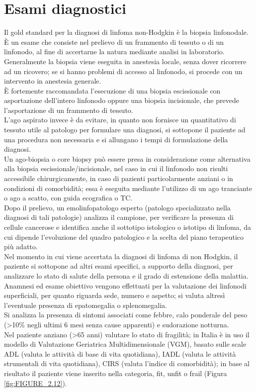 \section{Esami diagnostici}
Il gold standard per la diagnosi di linfoma non-Hodgkin è la biopsia linfonodale. 
È un esame che consiste nel prelievo di un frammento di tessuto o di un linfonodo, al fine di 
accertarne la natura mediante analisi in laboratorio. 
Generalmente la biopsia viene eseguita in anestesia locale, senza dover ricorrere ad un ricovero; 
se si hanno problemi di accesso al linfonodo, si procede con un intervento in anestesia generale\cite{ISS}.\\
È fortemente raccomandata l’esecuzione di una biopsia escissionale con asportazione dell’intero linfonodo 
oppure una biopsia incisionale, che prevede l’asportazione di un frammento di tessuto\cite{AMERICANCANCER}.\\ 
L’ago aspirato invece è da evitare, in quanto non fornisce un quantitativo di tessuto utile al patologo per formulare 
una diagnosi, si sottopone il paziente ad una procedura non necessaria e si allungano i tempi di formulazione 
della diagnosi\cite{reteveneta}.\\
Un ago-biopsia o core biopsy può essere presa in considerazione come alternativa alla biopsia escissionale/incisionale,
nel caso in cui il linfonodo non risulti accessibile chirurgicamente, in caso di pazienti particolarmente anziani o in 
condizioni di comorbidità; essa è eseguita mediante l’utilizzo di un ago tranciante o ago a scatto, con guida 
ecografica o TC\cite{reteveneta}.\\
Dopo il prelievo, un emolinfopatologo esperto (patologo specializzato nella diagnosi di tali patologie) analizza 
il campione, per verificare la presenza di cellule cancerose e identifica anche il sottotipo 
istologico o istotipo di linfoma, da cui dipende l’evoluzione del quadro patologico e la scelta del piano 
terapeutico più adatto\cite{LLS}.\\

Nel momento in cui viene accertata la diagnosi di linfoma di non Hodgkin, il paziente si sottopone ad altri 
esami specifici, a supporto della diagnosi, per analizzare lo stato di salute della persona e il grado di 
estensione della malattia.\\
Anamnesi ed esame obiettivo vengono effettuati per la valutazione dei linfonodi superficiali, per quanto 
riguarda sede, numero e aspetto; si valuta altresì l'eventuale presenza di epatomegalia o splenomegalia.\\
Si analizza la presenza di sintomi associati come febbre, calo ponderale del peso 
(>10\% negli ultimi 6 mesi senza cause apparenti) e sudorazione notturna\cite{reteveneta}.\\
Nel paziente anziano (>65 anni) valutare lo stato di fragilità; in Italia è in uso il modello di 
Valutazione Geriatrica Multidimensionale (VGM), basato sulle scale ADL (valuta le attività di base di vita quotidiana),
IADL (valuta le attività strumentali di vita quotidiana), CIRS (valuta l’indice di comorbidità); 
in base al risultato il paziente viene inserito nella categoria, fit, unfit o frail (Figura \ref{fig:FIGURE_2.12})\cite{AIOM}.

